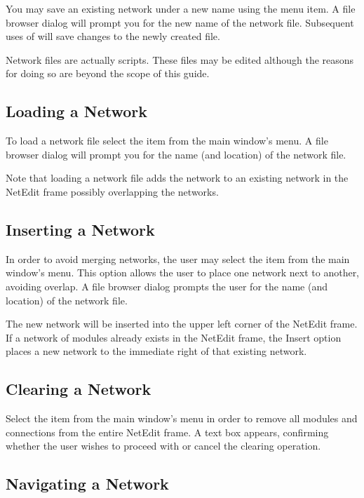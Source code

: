 You may save an existing network under a new name using the
 menu item.  A file browser dialog will prompt
you for the new name of the network file.  Subsequent uses of
 will save changes to the newly created file.

Network files are actually  scripts.
These files may be edited although the reasons for doing so are beyond
the scope of this guide.

\subsection{Loading a Network}
\label{sec:opennet}

To load a network file select the  item from the main
window's  menu.   A file browser dialog will prompt you for the
name (and location) of the network file.

Note that loading a network file adds the network to an existing network in
the NetEdit frame possibly overlapping the networks.

\subsection{Inserting a Network}
\label{sec:insertnetwork}

In order to avoid merging networks, the user may select the
 item from the main window's  menu. This
option allows the user to place one \sr{} network next to another,
avoiding overlap.  A file browser dialog prompts the user for the name (and
location) of the network file.

The new network will be inserted into the upper left corner of the NetEdit
frame.  If a network of modules already exists in the NetEdit frame, the
Insert option places a new network to the immediate right of that existing
network. 

\subsection{Clearing a Network}
\label{sec:clearnetwork}

Select the  item from the main window's 
menu in order to remove all modules and connections from the entire
NetEdit frame.  A text box appears, confirming whether the user wishes
to proceed with or cancel the clearing operation.

\subsection{Navigating a Network}
\label{sec:navnetwork}

